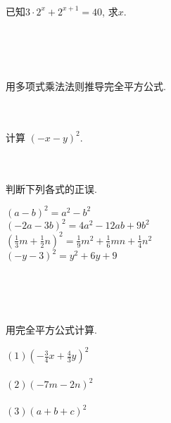 \\ \\ \\
\item{
    已知$3\cdot2^x + 2^{x+1}=40$, 求$x$.
        \iffalse
        \fangsong\zihao{4}
        思路: 将左边的2个$2^{x}$整理到一起.
    
        解答: 
        \begin{align*}
            3\cdot2^x + 2^{x+1} &= 40\\
            3\cdot2^x + 2\cdot 2^{x} &= 40\\
            5\cdot2^x &= 40\\
            2^x &= 8\\
            \therefore x = 3.
        \end{align*}
        \fi
}
\\ \\ \\
\item{
    用多项式乘法法则推导完全平方公式.
}
\\ \\ \\
\item{
    计算 $(-x-y)^2$.
}
\\ \\ \\
\item{
    判断下列各式的正误.

    $(a-b)^2 = a^2 - b^2$\\
    $(-2a-3b)^2 = 4a^2 - 12ab +9b^2$\\
    $(\frac13 m + \frac12 n)^2 = \frac19 m^2 + \frac16 mn + \frac14 n^2$\\
    $(-y-3)^2 = y^2 + 6y + 9$
}
\\ \\ \\
\item{
    用完全平方公式计算.

    $(1) (-\frac34 x + \frac43 y)^2$ \\ \\
    $(2) (-7m-2n)^2$ \\ \\
    $(3) (a+b+c)^2$ \\ \\
}
\\ \\ \\